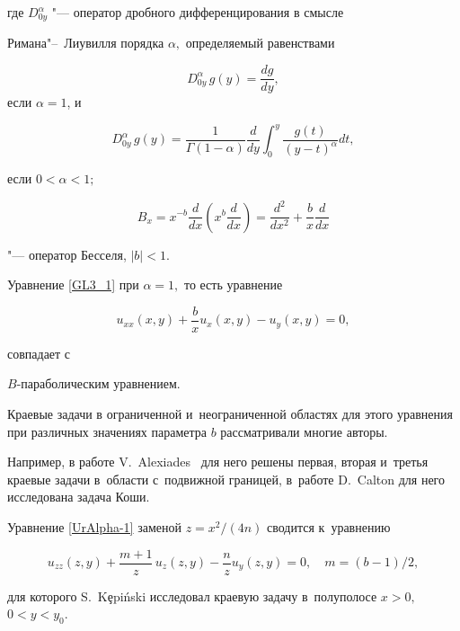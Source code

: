 где $D_{0y}^{\alpha}$ "--- оператор дробного дифференцирования в смысле  

Римана"--~Лиувилля  порядка $\alpha,$ определяемый равенствами~\cite{Drob, Pskhu}   

$$D_{0y}^{\alpha} \, g(y)= \frac{dg}{dy},$$ если $\alpha=1$, и

$$ 

D_{0y}^{\alpha}\,g(y)=\frac{1}{\Gamma(1-\alpha)}\frac{d}{dy}

\int _{0}^{y}\frac{g(t)}{(y-t)^{\alpha}}dt,

$$ 

если $0<\alpha<1;$

$$

B_x=x^{-b} \frac{d}{dx}\left(x^b \frac{d}{dx}\right)=\frac{d^2}{d x^2}+\frac{b}{x} \frac{d}{d x}

$$

"--- оператор Бесселя, $|b|<1.$



Уравнение \eqref{GL3_1} при $\alpha=1,$ то есть уравнение

\begin{equation}\label{UrAlpha-1}

u_{xx}(x,y)+\frac{b}{x}u_{x}(x,y)-u_{y}(x,y)=0,

\end{equation}

совпадает с %

$B$-параболическим уравнением.

Краевые задачи в ограниченной и~неограниченной областях для этого уравнения при различных значениях параметра $b$ рассматривали многие авторы. 

Например, в работе V.~Alexia\-des~\cite{Alexiades} для него решены первая, вторая и~третья краевые задачи в~области с~подвижной границей, в~работе D.~Calton\cite{Calton} для него  исследована задача Коши.

 

 Уравнение \eqref{UrAlpha-1} заменой $z=x^2/(4n)$ сводится к~уравнению

\begin{equation} \label{UrKep2}

u_{zz}(z,y)+\frac{m+1}{z}\,u_{z}(z,y)-\frac{n}{z} u_{y}(z,y)=0,\quad m=(b-1)/2,

\end{equation}

для которого S.~K\c{e}pi\'nski  \cite{Kepinski_2} исследовал краевую задачу в~полуполосе $x>0,$ $0<y<y_0.$

